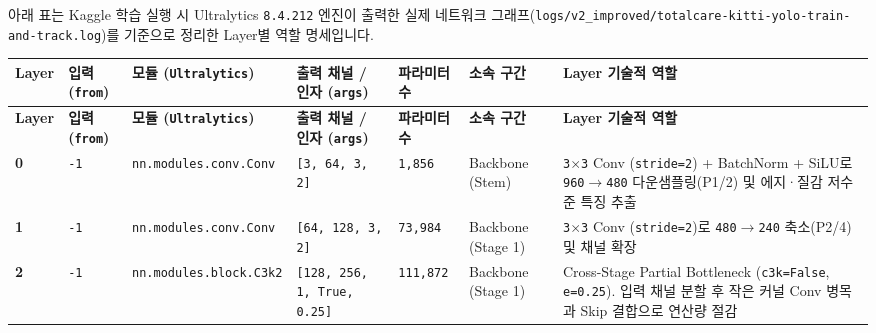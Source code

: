 \documentclass[10.5pt,a4paper]{article}
\begin{document}
아래 표는 Kaggle 학습 실행 시 Ultralytics \texttt{8.\allowbreak{}4.\allowbreak{}212} 엔진이 출력한 실제 네트워크 그래프(\texttt{logs/\allowbreak{}v2\_\allowbreak{}improved/\allowbreak{}totalcare-\allowbreak{}kitti-\allowbreak{}yolo-\allowbreak{}train-\allowbreak{}and-\allowbreak{}track.\allowbreak{}log})를 기준으로 정리한 Layer별 역할 명세입니다.



\begin{footnotesize}
\setlength{\tabcolsep}{4pt}
\setlength{\LTleft}{0pt}\setlength{\LTright}{0pt}
\begin{longtable}{>{\raggedright\arraybackslash}p{} >{\raggedright\arraybackslash}p{} >{\raggedright\arraybackslash}p{} >{\raggedright\arraybackslash}p{} >{\raggedright\arraybackslash}p{} >{\raggedright\arraybackslash}p{} >{\raggedright\arraybackslash}p{}}
\toprule
\textbf{Layer} & \textbf{입력(\texttt{from})} & \textbf{모듈 (\texttt{Ultralytics})} & \textbf{출력 채널 / 인자 (\texttt{args})} & \textbf{파라미터 수} & \textbf{소속 구간} & \textbf{Layer 기술적 역할} \\
\midrule
\endfirsthead
\toprule
\textbf{Layer} & \textbf{입력(\texttt{from})} & \textbf{모듈 (\texttt{Ultralytics})} & \textbf{출력 채널 / 인자 (\texttt{args})} & \textbf{파라미터 수} & \textbf{소속 구간} & \textbf{Layer 기술적 역할} \\
\midrule
\endhead
\bottomrule
\endfoot
\textbf{0} & \texttt{-\allowbreak{}1} & \texttt{nn.\allowbreak{}modules.\allowbreak{}conv.\allowbreak{}Conv} & \texttt{[3,\allowbreak{} 64,\allowbreak{} 3,\allowbreak{} 2]} & \texttt{1,\allowbreak{}856} & Backbone (Stem) & \texttt{3$\times$3} Conv (\texttt{stride=2}) + BatchNorm + SiLU로 \texttt{960$\rightarrow$480} 다운샘플링(P1/2) 및 에지·질감 저수준 특징 추출 \\
\textbf{1} & \texttt{-\allowbreak{}1} & \texttt{nn.\allowbreak{}modules.\allowbreak{}conv.\allowbreak{}Conv} & \texttt{[64,\allowbreak{} 128,\allowbreak{} 3,\allowbreak{} 2]} & \texttt{73,\allowbreak{}984} & Backbone (Stage 1) & \texttt{3$\times$3} Conv (\texttt{stride=2})로 \texttt{480$\rightarrow$240} 축소(P2/4) 및 채널 확장 \\
\textbf{2} & \texttt{-\allowbreak{}1} & \texttt{nn.\allowbreak{}modules.\allowbreak{}block.\allowbreak{}C3k2} & \texttt{[128,\allowbreak{} 256,\allowbreak{} 1,\allowbreak{} True,\allowbreak{} 0.\allowbreak{}25]} & \texttt{111,\allowbreak{}872} & Backbone (Stage 1) & Cross-Stage Partial Bottleneck (\texttt{c3k=False}, \texttt{e=0.\allowbreak{}25}). 입력 채널 분할 후 작은 커널 Conv 병목과 Skip 결합으로 연산량 절감 \\

\end{longtable}
\end{footnotesize}
\end{document}
